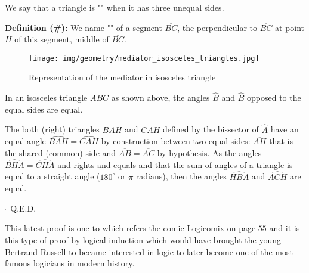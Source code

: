 	\begin{tcolorbox}[title=Remark,colframe=black,arc=10pt]
	We say that a triangle is "" when it has three unequal sides.
	\end{tcolorbox}
	\textbf{Definition (\#\mydef):} We name "" of a segment $\overline{BC}$, the perpendicular to $\overline{BC}$ at point $H$ of this segment, middle of $\overline{BC}$.
	\begin{figure}[H]
		\centering
		\texttt{[image: img/geometry/mediator\_isosceles\_triangles.jpg]}
		\caption{Representation of the mediator in isosceles triangle}
	\end{figure}
	\begin{theorem}
	In an isosceles triangle $ABC$ as shown above, the angles $\hat{B}$ and $\hat{B}$ opposed to the equal sides are equal.
	\end{theorem}
	
	\begin{dem}
	The both (right) triangles $BAH$ and $CAH$ defined by the bissector of  $\widehat{A}$ have an equal angle $\widehat{BAH}=\widehat{CAH}$ by construction between two equal sides: $\overline{AH}$ that is the shared (common) side and $\overline{AB} = \overline{AC}$ by hypothesis. As the angles $\widehat{BHA}=\widehat{CHA}$ and rights and equals and that the sum of angles of a triangle is equal to a straight angle ($180^\circ$ or $\pi$ radians), then the angles $\widehat{HBA}$ and $\widehat{ACH}$ are equal.
	\begin{flushright}
		$\square$  Q.E.D.
	\end{flushright}
	\end{dem}
	\begin{tcolorbox}[title=Remark,colframe=black,arc=10pt]
	This latest proof is one to which refers the comic Logicomix on page $55$ and it is this type of proof by logical induction which would have brought the young Bertrand Russell to became interested in logic to later become one of the most famous logicians in modern history.
	\end{tcolorbox}
	
